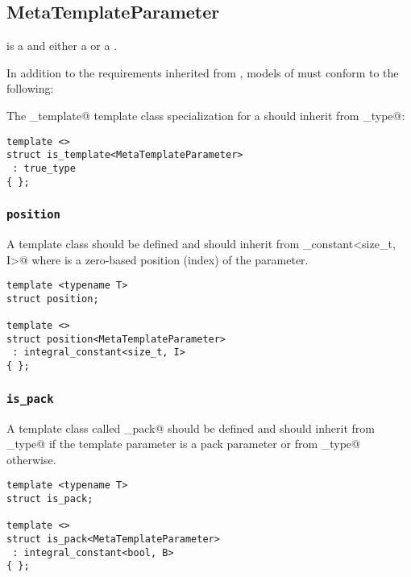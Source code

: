 \subsection{MetaTemplateParameter}
\label{concept-MetaTemplateParameter}



 is a  and either a  or a .

In addition to the requirements inherited from ,
models of  must conform to the following:

The \verb@is_template@ template class specialization for a  should
inherit from \verb@true_type@:

\begin{verbatim}
template <>
struct is_template<MetaTemplateParameter>
 : true_type
{ };
\end{verbatim}

\subsubsection{\texttt{position}}

A template class \verb@position@ should be defined and should
inherit from \verb@integral_constant<size_t, I>@ where \verb@I@ is
a zero-based position (index) of the parameter.

\begin{verbatim}
template <typename T>
struct position;

template <>
struct position<MetaTemplateParameter>
 : integral_constant<size_t, I>
{ };
\end{verbatim}

\subsubsection{\texttt{is\_pack}}

A template class called \verb@is_pack@ should be defined and should
inherit from \verb@true_type@ if the template parameter is a pack
parameter or from \verb@false_type@ otherwise.

\begin{verbatim}
template <typename T>
struct is_pack;

template <>
struct is_pack<MetaTemplateParameter>
 : integral_constant<bool, B>
{ };
\end{verbatim}


